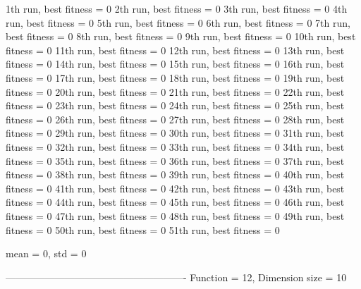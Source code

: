 1th run, best fitness = 0
2th run, best fitness = 0
3th run, best fitness = 0
4th run, best fitness = 0
5th run, best fitness = 0
6th run, best fitness = 0
7th run, best fitness = 0
8th run, best fitness = 0
9th run, best fitness = 0
10th run, best fitness = 0
11th run, best fitness = 0
12th run, best fitness = 0
13th run, best fitness = 0
14th run, best fitness = 0
15th run, best fitness = 0
16th run, best fitness = 0
17th run, best fitness = 0
18th run, best fitness = 0
19th run, best fitness = 0
20th run, best fitness = 0
21th run, best fitness = 0
22th run, best fitness = 0
23th run, best fitness = 0
24th run, best fitness = 0
25th run, best fitness = 0
26th run, best fitness = 0
27th run, best fitness = 0
28th run, best fitness = 0
29th run, best fitness = 0
30th run, best fitness = 0
31th run, best fitness = 0
32th run, best fitness = 0
33th run, best fitness = 0
34th run, best fitness = 0
35th run, best fitness = 0
36th run, best fitness = 0
37th run, best fitness = 0
38th run, best fitness = 0
39th run, best fitness = 0
40th run, best fitness = 0
41th run, best fitness = 0
42th run, best fitness = 0
43th run, best fitness = 0
44th run, best fitness = 0
45th run, best fitness = 0
46th run, best fitness = 0
47th run, best fitness = 0
48th run, best fitness = 0
49th run, best fitness = 0
50th run, best fitness = 0
51th run, best fitness = 0

mean = 0, std = 0

-------------------------------------------------------
Function = 12, Dimension size = 10


